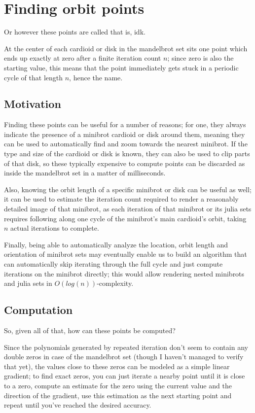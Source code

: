 \documentclass[12pt,a4paper]{article}
\begin{document}
	
\section{Finding orbit points}

Or however these points are called that is, idk.

At the center of each cardioid or disk in the mandelbrot set sits one point which ends up exactly at zero after a finite iteration count $n$; since zero is also the starting value, this means that the point immediately gets stuck in a periodic cycle of that length $n$, hence the name.

\subsection{Motivation}

Finding these points can be useful for a number of reasons; for one, they always indicate the presence of a minibrot cardioid or disk around them, meaning they can be used to automatically find and zoom towards the nearest minibrot. If the type and size of the cardioid or disk is known, they can also be used to clip parts of that disk, so these typically expensive to compute points can be discarded as inside the mandelbrot set in a matter of milliseconds.

Also, knowing the orbit length of a specific minibrot or disk can be useful as well; it can be used to estimate the iteration count required to render a reasonably detailed image of that minibrot, as each iteration of that minibrot or its julia sets requires following along one cycle of the minibrot's main cardioid's orbit, taking $n$ actual iterations to complete.

Finally, being able to automatically analyze the location, orbit length and orientation of minibrot sets may eventually enable us to build an algorithm that can automatically skip iterating through the full cycle and just compute iterations on the minibrot directly; this would allow rendering nested minibrots and julia sets in $O(log(n))$-complexity.

\subsection{Computation}

So, given all of that, how can these points be computed?

Since the polynomials generated by repeated iteration don't seem to contain any double zeros in case of the mandelbrot set (though I haven't managed to verify that yet), the values close to these zeros can be modeled as a simple linear gradient; to find exact zeros, you can just iterate a nearby point until it is close to a zero, compute an estimate for the zero using the current value and the direction of the gradient, use this estimation as the next starting point and repeat until you've reached the desired accuracy.
\end{document}
